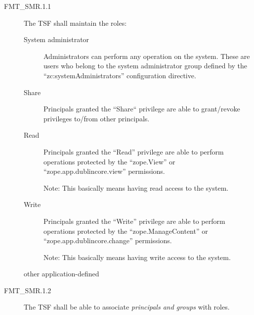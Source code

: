 \documentclass[12pt,english]{scrbook}
\begin{document}




\begin{description}
    \item[FMT{\_}SMR.1.1]

    The TSF shall maintain the roles:

\begin{description}

\item[System administrator]

Administrators can perform any operation on the system. These are users who
belong to the system administrator group defined by the
``zc:systemAdministrators'' configuration directive.

\item[Share]

Principals granted the ``Share`` privilege are able to grant/revoke privileges
to/from other principals.

\item[Read]

Principals granted the ``Read'' privilege are able to perform operations
protected by the ``zope.View'' or ``zope.app.dublincore.view'' permissions.

Note: This basically means having read access to the system.

\item[Write]

Principals granted the ``Write'' privilege are able to perform operations
protected by the ``zope.ManageContent'' or ``zope.app.dublincore.change'' permissions.

Note: This basically means having write access to the system.

\item[other application-defined]

\end{description}

\item[FMT{\_}SMR.1.2]

The TSF shall be able to associate \emph{principals and groups} with roles.

\end{description}


\end{document}
